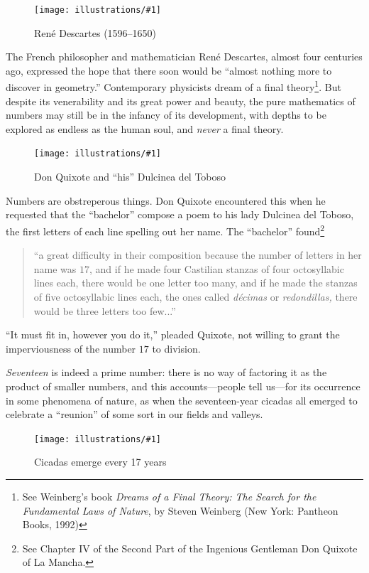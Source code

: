 \documentclass[openany]{book}
\newcommand{\ill}[3]{%
   \begin{figure}[H]%
   \vspace{-2ex}
   \centering%
   \texttt{[image: illustrations/\#1]}%
   \caption{#3}%
   \vspace{-2ex}
    \end{figure}}
\theoremstyle{plain}
\theoremstyle{definition}
\begin{document}
\ill{descartes}{.35}{Ren\'e Descartes (1596--1650)}

The French philosopher and mathematician Ren\'e Descartes, almost four
centuries ago, expressed the hope that there soon would be ``almost
nothing more to discover in geometry.'' Contemporary physicists dream
of a final theory\footnote{See Weinberg's book {\em Dreams of a
    Final Theory: The Search for the Fundamental Laws of Nature}, by
  Steven Weinberg (New York: Pantheon Books, 1992)}.  But despite its
venerability and its great power and beauty, the pure mathematics of
numbers may still be in the infancy of its development, with depths to
be explored as endless as the human soul, and {\it never} a final theory.



\ill{quixote}{.5}{Don Quixote and ``his'' Dulcinea del Toboso}

Numbers are obstreperous things. Don Quixote encountered this when he
requested that the ``bachelor'' compose a poem to his lady Dulcinea del
Toboso, the first letters of each line spelling out her name. The
``bachelor'' found\footnote{See Chapter IV of the Second Part of the Ingenious Gentleman Don Quixote of La Mancha.}

\begin{quote}
  ``a great difficulty in their composition because the number of
  letters in her name was $17$, and if he made four Castilian stanzas
  of four octosyllabic lines each, there would be one letter too many,
  and if he made the stanzas of five octosyllabic lines each, the ones
  called {\em d{\'e}cimas} or {\em redondillas,} there would be three
  letters too few...''
\end{quote}

``It must fit in, however you do it,'' pleaded Quixote, not willing to
grant the imperviousness of the number $17$ to division.





{\em Seventeen} is indeed a prime number: there is no way of factoring
it as the product of smaller numbers, and this accounts---people tell
us---for its occurrence in some phenomena of nature, as when
the seventeen-year cicadas all emerged to celebrate a ``reunion'' of some
sort in our fields and valleys.

\ill{cicada}{.35}{Cicadas emerge every 17 years}
\end{document}
